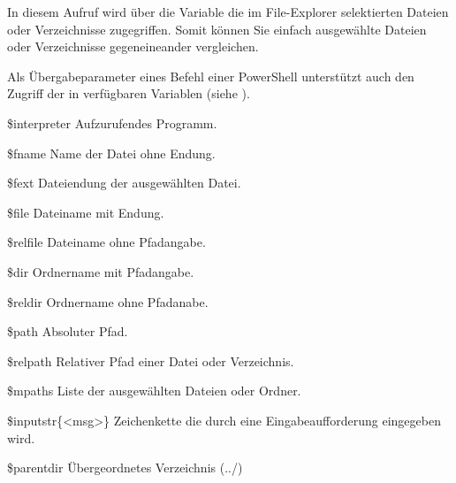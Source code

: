 In diesem Aufruf wird über die Variable  die im File-Explorer selektierten Dateien oder Verzeichnisse zugegriffen. Somit können Sie einfach ausgewählte Dateien oder Verzeichnisse gegeneineander vergleichen.

Als Übergabeparameter eines Befehl einer PowerShell unterstützt auch den Zugriff der in \codeblocks verfügbaren Variablen (siehe ).

\begin{codeentry}
\item[\$interpreter] Aufzurufendes Programm.
\item[\$fname] Name der Datei ohne Endung.
\item[\$fext] Dateiendung der ausgewählten Datei.
\item[\$file]Dateiname mit Endung.
\item[\$relfile] Dateiname ohne Pfadangabe.
\item[\$dir] Ordnername mit Pfadangabe.
\item[\$reldir] Ordnername ohne Pfadanabe.
\item[\$path] Absoluter Pfad.
\item[\$relpath] Relativer Pfad einer Datei oder Verzeichnis.
\item[\$mpaths] Liste der ausgewählten Dateien oder Ordner.
\item[\$inputstr\{<msg>\}] Zeichenkette die durch eine Eingabeaufforderung eingegeben wird.
\item[\$parentdir] Übergeordnetes Verzeichnis (../)
\end{codeentry}



%
%
%
%

